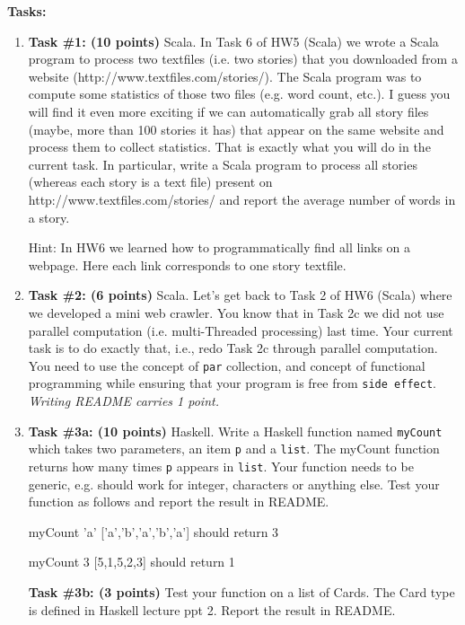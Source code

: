 \documentclass[paper=letter, fontsize=11pt]{scrartcl} %
\begin{document}
    \textbf{Tasks:}
    \begin{enumerate}

       \item \textbf{Task \#1: (10 points)} Scala. In Task 6 of HW5 (Scala) we wrote a Scala program to process 
two textfiles (i.e. two stories) that you downloaded from a website (http://www.textfiles.com/stories/). The 
Scala program was to compute some statistics of those two files (e.g. word count, etc.). 
I guess you will find it even more exciting if we can automatically grab all story files 
(maybe, more than 100 stories it has) that appear on the same website
and process them to collect statistics. That is exactly what you will do in the current task.
In particular, write a Scala program to process all stories (whereas each story is a text file) present on
 http://www.textfiles.com/stories/ and report the average number of words in a story. 

Hint: In HW6 we learned how to programmatically find all links on a webpage. Here each link corresponds to one story textfile.   
 
       \item \textbf{Task \#2: (6 points)} Scala. Let's get back to Task 2 of HW6 (Scala) where we developed a mini web crawler. 
You know that in Task 2c we did not use parallel computation (i.e. multi-Threaded processing) last time. 
Your current task is to do exactly that, i.e., redo Task 2c through parallel computation.  
You need to use the concept of \texttt{par} collection, and concept of functional programming while ensuring that your program is free from \texttt{side effect}. 
\emph{Writing README carries 1 point.}


        \item \textbf{Task \#3a: (10 points)} Haskell. Write a Haskell function named \texttt{myCount} 
which takes two parameters, an item \texttt{p} and a \texttt{list}. 
The myCount function returns how many times \texttt{p} appears in \texttt{list}. 
Your function needs to be generic, e.g. should work for integer, characters or anything else. 
Test your function as follows and report the result in README.

myCount 'a' ['a','b','a','b','a'] should return 3

myCount  3 [5,1,5,2,3]  should return 1

\textbf{Task \#3b: (3 points)} 
Test your function on a list of Cards. The Card type is defined in Haskell lecture ppt 2.  
Report the result in README.


\end{enumerate}
\end{document}
